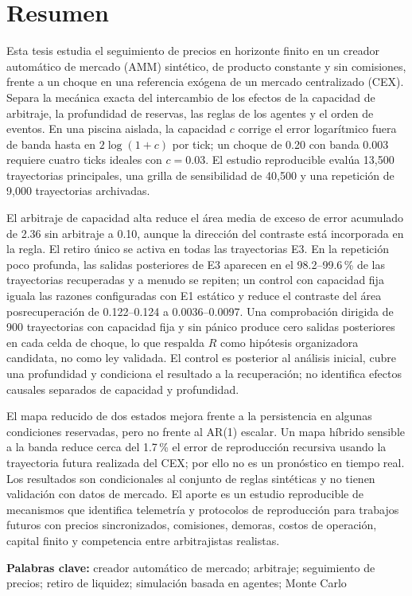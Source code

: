\section{Resumen}

Esta tesis estudia el seguimiento de precios en horizonte finito en un creador automático de mercado (AMM) sintético, de producto constante y sin comisiones, frente a un choque en una referencia exógena de un mercado centralizado (CEX). Separa la mecánica exacta del intercambio de los efectos de la capacidad de arbitraje, la profundidad de reservas, las reglas de los agentes y el orden de eventos. En una piscina aislada, la capacidad $c$ corrige el error logarítmico fuera de banda hasta en $2\log(1+c)$ por tick; un choque de 0.20 con banda 0.003 requiere cuatro ticks ideales con $c=0.03$. El estudio reproducible evalúa 13,500 trayectorias principales, una grilla de sensibilidad de 40,500 y una repetición de 9,000 trayectorias archivadas.

El arbitraje de capacidad alta reduce el área media de exceso de error acumulado de 2.36 sin arbitraje a 0.10, aunque la dirección del contraste está incorporada en la regla. El retiro único se activa en todas las trayectorias E3. En la repetición poco profunda, las salidas posteriores de E3 aparecen en el 98.2--99.6\,\% de las trayectorias recuperadas y a menudo se repiten; un control con capacidad fija iguala las razones configuradas con E1 estático y reduce el contraste del área posrecuperación de 0.122--0.124 a 0.0036--0.0097. Una comprobación dirigida de 900 trayectorias con capacidad fija y sin pánico produce cero salidas posteriores en cada celda de choque, lo que respalda $R$ como hipótesis organizadora candidata, no como ley validada. El control es posterior al análisis inicial, cubre una profundidad y condiciona el resultado a la recuperación; no identifica efectos causales separados de capacidad y profundidad.

El mapa reducido de dos estados mejora frente a la persistencia en algunas condiciones reservadas, pero no frente al AR(1) escalar. Un mapa híbrido sensible a la banda reduce cerca del 1.7\,\% el error de reproducción recursiva usando la trayectoria futura realizada del CEX; por ello no es un pronóstico en tiempo real. Los resultados son condicionales al conjunto de reglas sintéticas y no tienen validación con datos de mercado. El aporte es un estudio reproducible de mecanismos que identifica telemetría y protocolos de reproducción para trabajos futuros con precios sincronizados, comisiones, demoras, costos de operación, capital finito y competencia entre arbitrajistas realistas.

\textbf{Palabras clave:} creador automático de mercado; arbitraje; seguimiento de precios; retiro de liquidez; simulación basada en agentes; Monte Carlo
